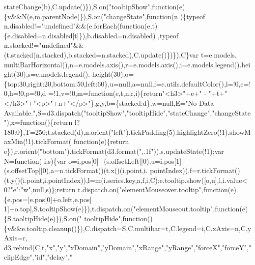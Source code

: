 \begin{DoxyCode}
      stateChange(b),C.update()\}),S.on(\textcolor{stringliteral}{"tooltipShow"},\textcolor{keyword}{function}(e)\{v&&N(e,m.parentNode)\}),S.on(\textcolor{stringliteral}{"changeState"},\textcolor{keyword}{function}(n
      )\{typeof n.disabled!=\textcolor{stringliteral}{"undefined"}&&(e.forEach(\textcolor{keyword}{function}(e,t)\{e.disabled=n.disabled[t]\}),b.disabled=n.disabled)
      ,typeof n.stacked!=\textcolor{stringliteral}{"undefined"}&&(t.stacked(n.stacked),b.stacked=n.stacked),C.update()\})\}),C\}var t=e.models.
      multiBarHorizontal(),n=e.models.axis(),r=e.models.axis(),i=e.models.legend().height(30),s=e.models.legend().
      height(30),o=\{top:30,right:20,bottom:50,left:60\},u=null,a=null,f=e.utils.defaultColor(),l=!0,c=!0,h=!0,p=!0,d
      =!1,v=!0,m=\textcolor{keyword}{function}(e,t,n,r,i)\{\textcolor{keywordflow}{return}\textcolor{stringliteral}{"<h3>"}+e+\textcolor{stringliteral}{" - "}+t+\textcolor{stringliteral}{"</h3>"}+\textcolor{stringliteral}{"<p>"}+n+\textcolor{stringliteral}{"</p>"}\},g,y,b=\{stacked:d\},w=null,E=\textcolor{stringliteral}{"No
       Data Available."},S=d3.dispatch(\textcolor{stringliteral}{"tooltipShow"},\textcolor{stringliteral}{"tooltipHide"},\textcolor{stringliteral}{"stateChange"},\textcolor{stringliteral}{"changeState"}),x=\textcolor{keyword}{function}()\{\textcolor{keywordflow}{return}
       l?180:0\},T=250;t.stacked(d),n.orient(\textcolor{stringliteral}{"left"}).tickPadding(5).highlightZero(!1).showMaxMin(!1).tickFormat(\textcolor{keyword}{
      function}(e)\{\textcolor{keywordflow}{return} e\}),r.orient(\textcolor{stringliteral}{"bottom"}).tickFormat(d3.format(\textcolor{stringliteral}{",.1f"})),s.updateState(!1);var N=\textcolor{keyword}{function}(
      i,s)\{var o=i.pos[0]+(s.offsetLeft||0),u=i.pos[1]+(s.offsetTop||0),a=n.tickFormat()(t.x()(i.point,i.
      pointIndex)),f=r.tickFormat()(t.y()(i.point,i.pointIndex)),l=m(i.series.key,a,f,i,C);e.tooltip.show([o,u],l,i.value<
      0?\textcolor{stringliteral}{"e"}:\textcolor{stringliteral}{"w"},null,s)\};\textcolor{keywordflow}{return} t.dispatch.on(\textcolor{stringliteral}{"elementMouseover.tooltip"},\textcolor{keyword}{function}(e)\{e.pos=[e.pos[0]+o.left,e.pos[
      1]+o.top],S.tooltipShow(e)\}),t.dispatch.on(\textcolor{stringliteral}{"elementMouseout.tooltip"},\textcolor{keyword}{function}(e)\{S.tooltipHide(e)\}),S.on(\textcolor{stringliteral}{"
      tooltipHide"},\textcolor{keyword}{function}()\{v&&e.tooltip.cleanup()\}),C.dispatch=S,C.multibar=t,C.legend=i,C.xAxis=n,C.yAxis=r,
      d3.rebind(C,t,\textcolor{stringliteral}{"x"},\textcolor{stringliteral}{"y"},\textcolor{stringliteral}{"xDomain"},\textcolor{stringliteral}{"yDomain"},\textcolor{stringliteral}{"xRange"},\textcolor{stringliteral}{"yRange"},\textcolor{stringliteral}{"forceX"},\textcolor{stringliteral}{"forceY"},\textcolor{stringliteral}{"clipEdge"},\textcolor{stringliteral}{"id"},\textcolor{stringliteral}{"delay"},\textcolor{stringliteral}{"
}
\end{DoxyCode}
